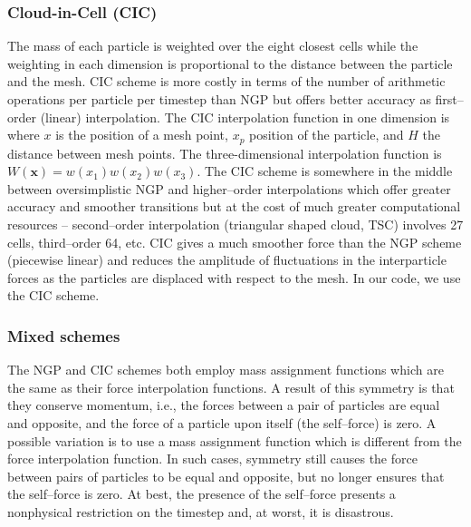 \subsubsection{Cloud-in-Cell (CIC)}
The mass of each particle is weighted over the eight closest cells while the weighting in each dimension is proportional to the distance between the particle and the mesh. CIC scheme is more costly in terms of the number of arithmetic operations per particle per timestep than NGP but offers better accuracy as first--order (linear) interpolation. The CIC interpolation function in one dimension is
where $x$ is the position of a mesh point, $x_p$ position of the particle, and $H$ the distance between mesh points. The three-dimensional interpolation function is \(W(\mathbf x)=w(x_1)w(x_2)w(x_3)\). The CIC scheme is somewhere in the middle between oversimplistic NGP and higher--order interpolations which offer greater accuracy and smoother transitions but at the cost of much greater computational resources -- second--order interpolation (triangular shaped cloud, TSC) involves 27 cells, third--order 64, etc. CIC gives a much smoother force than the NGP scheme (piecewise linear) and reduces the amplitude of fluctuations in the interparticle forces as the particles are displaced with respect to the mesh. In our code, we use the CIC scheme.
\subsubsection{Mixed schemes}
The NGP and CIC schemes both employ mass assignment functions which are the same as their force interpolation functions. A result of this symmetry is that they conserve momentum, i.e., the forces between a pair of particles are equal and opposite, and the force of a particle upon itself (the self--force) is zero. A possible variation is to use a mass assignment function which is different from the force interpolation function. In such cases, symmetry still causes the force between pairs of particles to be equal and opposite, but no longer ensures that the self--force is zero. At best, the presence of the self--force presents a nonphysical restriction on the timestep and, at worst, it is disastrous.

